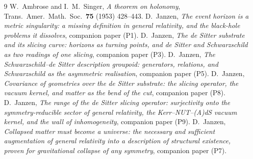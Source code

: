 \documentclass[11pt,a4paper]{article}
\theoremstyle{plain}
\theoremstyle{definition}
\theoremstyle{remark}
\begin{document}
\begin{thebibliography}{9}
 W.~Ambrose and I.~M.~Singer, \emph{A theorem on holonomy},
Trans.\ Amer.\ Math.\ Soc.\ \textbf{75} (1953) 428--443.
 D.~Janzen, \emph{The event horizon is a metric singularity: a missing definition in general relativity, and the black-hole problems it dissolves}, companion paper (P1).
 D.~Janzen, \emph{The de Sitter substrate and its slicing curve: horizons as turning points, and de Sitter and Schwarzschild as two readings of one slicing}, companion paper (P3).
 D.~Janzen, \emph{The Schwarzschild--de Sitter description groupoid: generators, relations, and Schwarzschild as the asymmetric realisation}, companion paper (P5).
 D.~Janzen, \emph{Covariance of geometries over the de Sitter substrate: the slicing operator, the vacuum kernel, and matter as the bend of the cut}, companion paper (P8).
 D.~Janzen, \emph{The range of the de Sitter slicing operator: surjectivity onto the symmetry-reducible sector of general relativity, the Kerr--NUT--(A)dS vacuum kernel, and the wall of inhomogeneity}, companion paper (P9).
 D.~Janzen, \emph{Collapsed matter must become a universe: the necessary and sufficient augmentation of general relativity into a description of structural existence, proven for gravitational collapse of any symmetry}, companion paper (P7).


\end{thebibliography}
\end{document}
